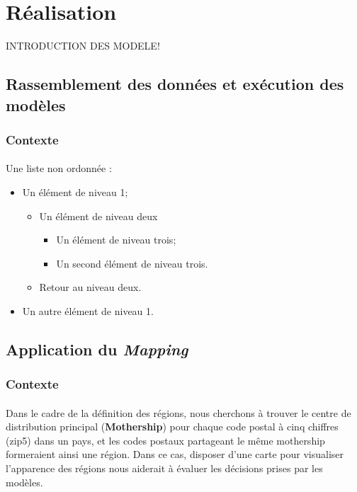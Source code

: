 \section{Réalisation}
INTRODUCTION DES MODELE!
\subsection{Rassemblement des données et exécution des modèles }
\subsubsection{Contexte}
\paragraph{}
\vspace{-2em}


Une liste non ordonnée :
\begin{itemize}
    \item Un élément de niveau 1;
    \begin{itemize}
        \item Un élément de niveau deux
        \begin{itemize}
            \item Un élément de niveau trois;
            \item Un second élément de niveau trois.
        \end{itemize}
        \item Retour au niveau deux.
    \end{itemize}
    \item Un autre élément de niveau 1.
\end{itemize}

\subsection{Application du \textit{Mapping}}
\subsubsection{Contexte}
\paragraph{}
\vspace{-2em}
Dans le cadre de la définition des régions, nous cherchons à trouver le centre de distribution principal (\textbf{Mothership}) pour chaque code postal à cinq chiffres (zip5) dans un pays, et les codes postaux partageant le même mothership formeraient ainsi une région. Dans ce cas, disposer d'une carte pour visualiser l'apparence des régions nous aiderait à évaluer les décisions prises par les modèles.
